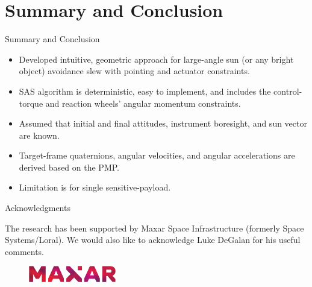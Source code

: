 \documentclass{beamer}
\begin{document}
\section{Summary and Conclusion}
\begin{frame}{Summary and Conclusion}
\begin{block}{}
	\begin{itemize}
		\item Developed intuitive, geometric approach for large-angle sun (or any bright object) avoidance slew with pointing and actuator constraints. 
		\item SAS algorithm is deterministic, easy to implement, and includes the control-torque and reaction wheels' angular momentum constraints. 
		\item Assumed that initial and final attitudes, instrument boresight, and sun vector are known. 
		\item Target-frame quaternions, angular velocities, and angular accelerations are derived based on the PMP. 
		\item Limitation is for single sensitive-payload. 
	\end{itemize}
	
\end{block}
\end{frame}
\begin{frame}{Acknowledgments}
\begin{block}{}
	The research has been supported by Maxar Space Infrastructure (formerly Space Systems/Loral). We would also like to acknowledge Luke DeGalan for his useful comments.
	
	
	\begin{figure}
		\centering
		\includegraphics[width=1.5in]{./figures/maxar_logo.png}
	\end{figure}
	 
\end{block}
\end{frame}
%
%
%
\end{document}
